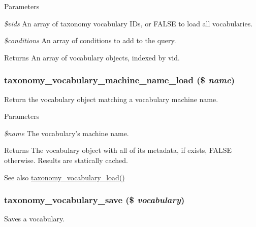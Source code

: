 \begin{DoxyParams}{Parameters}
\item[{\em \$vids}]An array of taxonomy vocabulary IDs, or FALSE to load all vocabularies. \item[{\em \$conditions}]An array of conditions to add to the query.\end{DoxyParams}
\begin{DoxyReturn}{Returns}
An array of vocabulary objects, indexed by vid. 
\end{DoxyReturn}
\hypertarget{taxonomy_8module_ae25133c12d174817672953ce9d0b297e}{
\subsubsection[{taxonomy\_\-vocabulary\_\-machine\_\-name\_\-load}]{\setlength{\rightskip}{0pt plus 5cm}taxonomy\_\-vocabulary\_\-machine\_\-name\_\-load (\$ {\em name})}}
\label{taxonomy_8module_ae25133c12d174817672953ce9d0b297e}
Return the vocabulary object matching a vocabulary machine name.


\begin{DoxyParams}{Parameters}
\item[{\em \$name}]The vocabulary's machine name.\end{DoxyParams}
\begin{DoxyReturn}{Returns}
The vocabulary object with all of its metadata, if exists, FALSE otherwise. Results are statically cached.
\end{DoxyReturn}
\begin{DoxySeeAlso}{See also}
\hyperlink{taxonomy_8module_ac9a55de2b9018930a690b7dde4f2ddb2}{taxonomy\_\-vocabulary\_\-load()} 
\end{DoxySeeAlso}
\hypertarget{taxonomy_8module_a5a68ca5e296097a5c45981a97a5c9dc6}{
\subsubsection[{taxonomy\_\-vocabulary\_\-save}]{\setlength{\rightskip}{0pt plus 5cm}taxonomy\_\-vocabulary\_\-save (\$ {\em vocabulary})}}
\label{taxonomy_8module_a5a68ca5e296097a5c45981a97a5c9dc6}
Saves a vocabulary.


